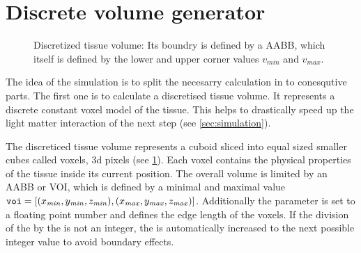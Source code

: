 \section{Discrete volume generator}
\label{sec:dv_generator}
%
\begin{figure}[!t]
\centering
\setlength{\tikzwidth}{0.5\textwidth}
\caption[discreticed tissue volume]{Discretized tissue volume: Its boundry is defined by a \ac{AABB}, which itself is defined by the lower and upper corner values $v_\mathit{min}$ and $v_\mathit{max}$. }
\label{fig:discVol}
\end{figure}
%
The idea of the simulation is to split the necesarry calculation in to conesqutive parts. The first one is to calculate a discretised tissue volume.
It represents a discrete constant voxel model of the tissue.
This helps to drastically speed up the light matter interaction of the next step (see \cref{sec:simulation}).
\par
%
The discreticed tissue volume represents a cuboid sliced into equal sized smaller cubes called voxels, \ie 3d pixels (see \cref{fig:discVol}).
Each voxel contains the physical properties of the tissue inside its current position.
The overall volume is limited by an \ac{AABB} or \ac{VOI}, which is defined by a minimal and maximal value $\texttt{voi} = [(x_{\mathit{min}}, y_{\mathit{min}}, z_{\mathit{min}}),(x_{\mathit{max}}, y_{\mathit{max}}, z_{\mathit{max}})]$.
Additionally the \voxelsize{} parameter \voxels{} is set to a floating point number and defines the edge length of the voxels.
If the division of the \voi{} by the \voxelsize{} is not an integer, the \voi{} is automatically increased to the next possible integer value to avoid boundary effects.
%
%
%

